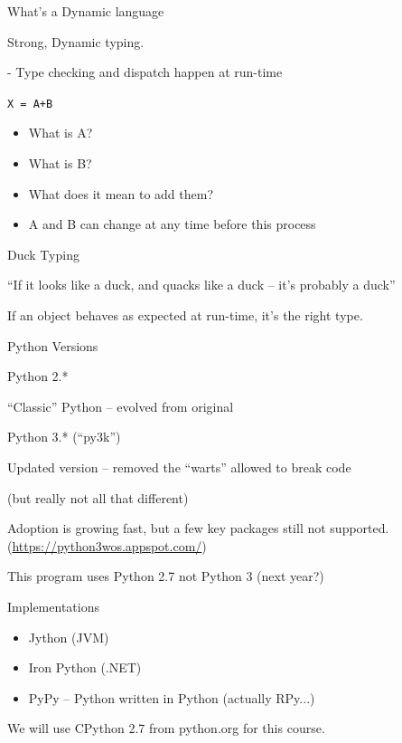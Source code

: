 \documentclass{beamer}
\begin{document}
\begin{frame}[fragile]{What's a Dynamic language}

{Strong, Dynamic typing.}

 - Type checking and dispatch happen at run-time

\vspace{0.25in}
{\Large \verb!X = A+B!}
\vspace{0.1in}
\begin{itemize}
\pause
  \item What is A?
  \item What is B?
  \item What does it mean to add them?
\vspace{0.2in}
\pause
  \item A and B can change at any time before this process
\end{itemize}

\end{frame} 


\begin{frame}{Duck Typing}

\vspace{0.25in}
{\center \Large ``If it looks like a duck, and quacks like a duck -- it's probably a duck''}

\pause
\vspace{0.5in}
{\center \Large If an object behaves as expected at run-time, it's the right type.}

\end{frame}



\begin{frame}{Python Versions}

{\Large Python 2.*}

``Classic'' Python -- evolved from original

\vfill
{\Large Python 3.* (``py3k'')}

Updated version -- removed the ``warts'' allowed to break code

(but really not all that different)

Adoption is growing fast, but a few key packages still not supported.
(\url{https://python3wos.appspot.com/})

\vfill
This program uses Python 2.7 not Python 3 (next year?)

\end{frame}


\begin{frame}{Implementations}

\begin{itemize}
    \item Jython (JVM)
    \item Iron Python (.NET)
    \item PyPy -- Python written in Python (actually RPy...)
\end{itemize}

\vspace{0.25in}
  We will use CPython 2.7 from python.org for this course.

\end{frame}
\end{document}
